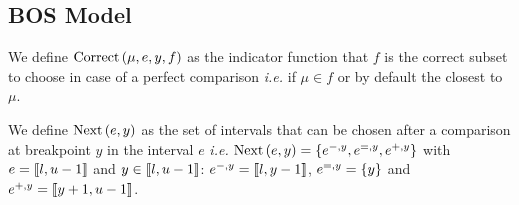 \subsection{BOS Model}

\begin{definition}
    We define $\text{Correct}\left(\mu, e, y, f\right)$ as the indicator function that $f$ is the correct subset to choose in case of a perfect comparison \textit{i.e.} if $\mu \in f$ or by default the closest to $\mu$.
\end{definition}

\begin{definition}
    We define $\text{Next}\left(e, y\right)$ as the set of intervals that can be chosen after a comparison at breakpoint $y$ in the interval $e$ \textit{i.e.} $\text{Next}\left(e, y\right) = \left\{ e^{-,y}, e^{=,y}, e^{+,y} \right\}$ with $e = \left\llbracket l, u - 1\right\rrbracket$ and $y \in \left\llbracket l, u - 1\right\rrbracket$: $e^{-,y} = \left\llbracket l, y - 1\right\rrbracket$, $e^{=,y} = \left\{ y \right\}$ and $e^{+,y} = \left\llbracket y + 1, u - 1\right\rrbracket$.
\end{definition}

